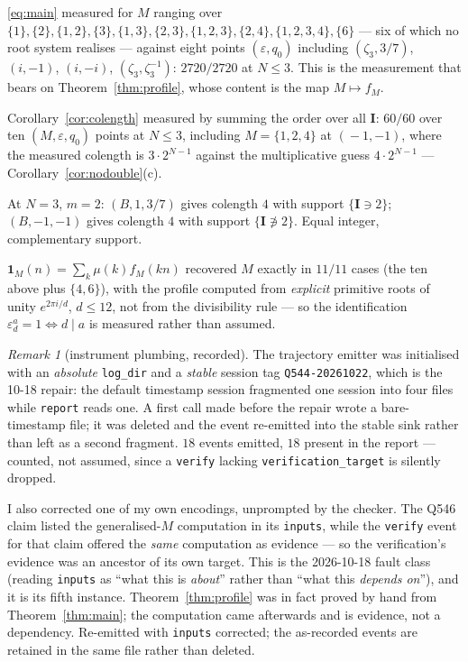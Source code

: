 \documentclass[11pt]{article}
\theoremstyle{definition}
\theoremstyle{remark}
\newtheorem{rem}[thm]{Remark}
\newcommand{\bI}{\mathbf{I}}
\begin{document}
\begin{description}[leftmargin=1.4em]
\item[Generalised multiplicity sets.]  \eqref{eq:main} measured for $M$ ranging over
  $\{1\},\{2\},\{1,2\},\{3\},\{1,3\},\{2,3\},\{1,2,3\},\{2,4\},\{1,2,3,4\},\{6\}$ ---
  six of which no root system realises --- against eight points
  $(\varepsilon,q_0)$ including $(\zeta_3,3/7)$, $(i,-1)$, $(i,-i)$,
  $(\zeta_3,\zeta_3^{-1})$: \textbf{$2720/2720$} at $N\le3$.  This is the measurement that
  bears on Theorem~\ref{thm:profile}, whose content is the map $M\mapsto f_M$.
\item[Colength.]  Corollary~\ref{cor:colength} measured by summing the order over all
  $\bI$: \textbf{$60/60$} over ten $(M,\varepsilon,q_0)$ points at $N\le3$, including
  $M=\{1,2,4\}$ at $(\!-1,-1)$, where the measured colength is $3\cdot2^{N-1}$ against the
  multiplicative guess $4\cdot2^{N-1}$ --- Corollary~\ref{cor:nodouble}(c).
\item[The support.]  At $N=3$, $m=2$: $(B,1,3/7)$ gives colength $4$ with support
  $\{\bI\ni2\}$; $(B,-1,-1)$ gives colength $4$ with support $\{\bI\not\ni2\}$.  Equal
  integer, complementary support.
\item[Möbius recovery.]  $\mathbf 1_M(n)=\sum_k\mu(k)f_M(kn)$ recovered $M$ exactly in
  $11/11$ cases (the ten above plus $\{4,6\}$), with the profile computed from
  \emph{explicit} primitive roots of unity $e^{2\pi i/d}$, $d\le12$, not from the
  divisibility rule --- so the identification $\varepsilon_d^{a}=1\iff d\mid a$ is
  measured rather than assumed.
\end{description}

\begin{rem}[instrument plumbing, recorded]
The trajectory emitter was initialised with an \emph{absolute} \texttt{log\_dir} and a
\emph{stable} session tag \texttt{Q544-20261022}, which is the 10-18 repair: the default
timestamp session fragmented one session into four files while \texttt{report} reads one.
A first call made before the repair wrote a bare-timestamp file; it was deleted and the
event re-emitted into the stable sink rather than left as a second fragment.
$18$ events emitted, $18$ present in the report --- counted, not assumed, since a
\texttt{verify} lacking \texttt{verification\_target} is silently dropped.

I also corrected one of my own encodings, unprompted by the checker.  The Q546 claim
listed the generalised-$M$ computation in its \texttt{inputs}, while the \texttt{verify}
event for that claim offered the \emph{same} computation as evidence --- so the
verification's evidence was an ancestor of its own target.  This is the 2026-10-18 fault
class (reading \texttt{inputs} as ``what this is \emph{about}'' rather than ``what this
\emph{depends on}''), and it is its fifth instance.  Theorem~\ref{thm:profile} was in fact
proved by hand from Theorem~\ref{thm:main}; the computation came afterwards and is
evidence, not a dependency.  Re-emitted with \texttt{inputs} corrected; the as-recorded
events are retained in the same file rather than deleted.
\end{rem}
\end{document}
